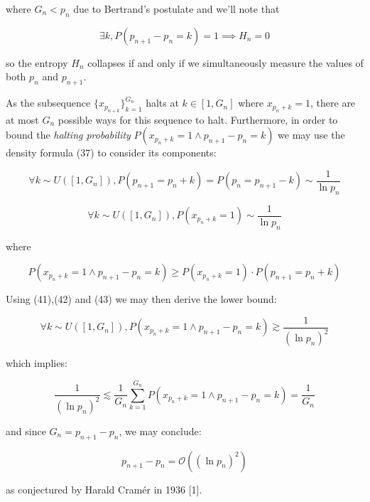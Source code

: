 \documentclass{article}
\newcommand{\gsim}{\gtrsim}
\newcommand{\lsim}{\lesssim}
\begin{document}
where $G_n < p_n$ due to Bertrand's postulate and we'll note that

\begin{equation}
\exists k, P(p_{n+1}-p_n = k) = 1 \implies H_n=0
\end{equation}

so the entropy $H_n$ collapses if and only if we simultaneously measure the values of both $p_n$ and $p_{n+1}$.

As the subsequence $\{x_{p_{n+k}}\}_{k=1}^{G_n}$ halts at $k \in [1,G_n]$ where $x_{p_n+k}=1$, there are at most $G_n$ possible
ways for this sequence to halt. Furthermore, in order to bound the \textit{halting probability} $P(x_{p_n + k} = 1 \land p_{n+1}-p_n = k)$ we may use the density formula (37) to consider its components:

\begin{equation}
\forall k \sim U([1,G_n]), P(p_{n+1} = p_n + k) = P(p_n = p_{n+1} -k) \sim \frac{1}{\ln p_n}
\end{equation}

\begin{equation}
\forall k \sim U([1,G_n]),P(x_{p_n + k} = 1) \sim \frac{1}{\ln p_n}
\end{equation}

where

\begin{equation}
P(x_{p_n + k} = 1 \land p_{n+1}-p_n = k) \geq P(x_{p_n + k} = 1) \cdot P(p_{n+1} = p_n + k)
\end{equation}

Using (41),(42) and (43) we may then derive the lower bound:

\begin{equation}
\forall k \sim U([1,G_n]),P(x_{p_n + k} = 1 \land p_{n+1}-p_n = k) \gsim \frac{1}{(\ln p_n)^2}
\end{equation}

which implies:

\begin{equation}
\frac{1}{(\ln p_n)^2} \lsim \frac{1}{G_n} \sum_{k=1}^{G_n} P(x_{p_n + k} = 1 \land p_{n+1}-p_n = k) = \frac{1}{G_n}
\end{equation}

and since $G_n = p_{n+1}-p_n$, we may conclude:

\begin{equation}
p_{n+1}-p_n = \mathcal{O}((\ln p_n)^2)
\end{equation}

as conjectured by Harald Cramér in 1936 [1].
\end{document}
